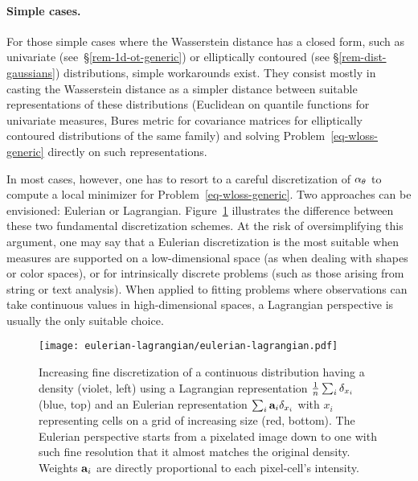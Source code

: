 \paragraph{Simple cases.} For those simple cases where the Wasserstein distance has a closed form, such as univariate (see~\S\ref{rem-1d-ot-generic}) or elliptically contoured (see \S\ref{rem-dist-gaussians}) distributions, simple workarounds exist. They consist mostly in casting the Wasserstein distance as a simpler distance between suitable representations of these distributions (Euclidean on quantile functions for univariate measures, Bures metric for covariance matrices for elliptically contoured distributions of the same family) and solving Problem~\eqref{eq-wloss-generic} directly on such representations. 

In most cases, however, one has to resort to a careful discretization of $\alpha_\theta$ to compute a local minimizer for Problem~\eqref{eq-wloss-generic}. Two approaches can be envisioned: Eulerian or Lagrangian. Figure~\ref{fig-eulerian-lagrangian} illustrates the difference between these two fundamental discretization schemes. At the risk of oversimplifying this argument, one may say that a Eulerian discretization is the most suitable when measures are supported on a low-dimensional space (as when dealing with shapes or color spaces), or for intrinsically discrete problems (such as those arising from string or text analysis). When applied to fitting problems where observations can take continuous values in high-dimensional spaces, a Lagrangian perspective is usually the only suitable choice.
%


\begin{figure}[h!]
\centering
\texttt{[image: eulerian-lagrangian/eulerian-lagrangian.pdf]}
\caption{\label{fig-eulerian-lagrangian}
Increasing fine discretization of a continuous distribution having a density (violet, left) using a Lagrangian representation $\frac{1}{n}\sum_i \delta_{x_i}$ (blue, top) and an Eulerian representation $\sum_i \mathrm{\textbf{a}}_i \delta_{x_i}$ with $x_i$ representing cells on a grid of increasing size (red, bottom). The Eulerian perspective starts from a pixelated image down to one with such fine resolution that it almost matches the original density. Weights $\mathrm{\textbf{a}}_i$ are directly proportional to each pixel-cell's intensity.
}
\end{figure}


